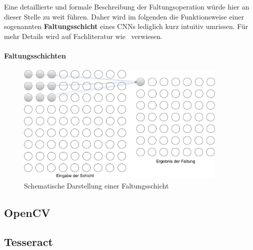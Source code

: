 Eine detaillierte und formale Beschreibung der Faltungsoperation w\"urde
hier an dieser Stelle zu weit f\"uhren. Daher wird im folgenden
die Funktionsweise einer sogenannten \textbf{Faltungsschicht} eines
CNNs lediglich kurz intuitiv umrissen. F\"ur mehr Details wird auf
Fachliteratur wie~\cite{Goodfellow-et-al-2016} verwiesen.

\paragraph{Faltungsschichten}

\begin{figure}[h]
    \centering
    \includegraphics[width=0.9\textwidth]{abbildungen/faltungsschicht}
    \caption{Schematische Darstellung einer Faltungsschicht}
    \label{fig:faltungsschicht}
\end{figure}

\subsection{OpenCV}

\subsection{Tesseract}